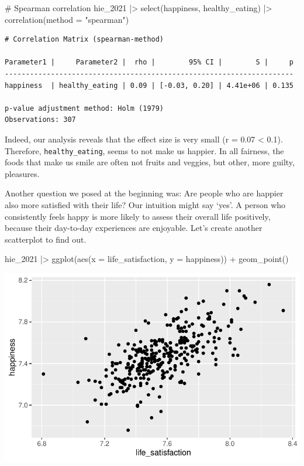 \documentclass[
  letterpaper,
]{krantz}
\makeatletter
\newenvironment{Shaded}{\begin{snugshade}}{\end{snugshade}}
\newcommand{\AttributeTok}[1]{\textcolor[rgb]{0.40,0.45,0.13}{#1}}
\newcommand{\CommentTok}[1]{\textcolor[rgb]{0.37,0.37,0.37}{#1}}
\newcommand{\FunctionTok}[1]{\textcolor[rgb]{0.28,0.35,0.67}{#1}}
\newcommand{\NormalTok}[1]{\textcolor[rgb]{0.00,0.23,0.31}{#1}}
\newcommand{\SpecialCharTok}[1]{\textcolor[rgb]{0.37,0.37,0.37}{#1}}
\newcommand{\StringTok}[1]{\textcolor[rgb]{0.13,0.47,0.30}{#1}}
\newenvironment{kframe}{%
\medskip{}
\setlength{\fboxsep}{.8em}
 \def\at@end@of@kframe{}%
 \ifinner\ifhmode%
  \def\at@end@of@kframe{\end{minipage}}%
  \begin{minipage}{\columnwidth}%
 \fi\fi%
 \def\FrameCommand##1{\hskip\@totalleftmargin \hskip-\fboxsep
 \colorbox{shadecolor}{##1}\hskip-\fboxsep
     \hskip-\linewidth \hskip-\@totalleftmargin \hskip\columnwidth}%
 \MakeFramed {\advance\hsize-\width
   \@totalleftmargin\z@ \linewidth\hsize
   \@setminipage}}%
 {\par\unskip\endMakeFramed%
 \at@end@of@kframe}
\renewenvironment{Shaded}{\begin{kframe}}{\end{kframe}}
\makeatother
\begin{document}
\begin{Shaded}
\begin{Highlighting}[]
\CommentTok{\# Spearman correlation}
\NormalTok{hie\_2021 }\SpecialCharTok{|\textgreater{}}
  \FunctionTok{select}\NormalTok{(happiness, healthy\_eating) }\SpecialCharTok{|\textgreater{}}
  \FunctionTok{correlation}\NormalTok{(}\AttributeTok{method =} \StringTok{"spearman"}\NormalTok{)}
\end{Highlighting}
\end{Shaded}

\begin{verbatim}
# Correlation Matrix (spearman-method)

Parameter1 |     Parameter2 |  rho |        95% CI |        S |     p
---------------------------------------------------------------------
happiness  | healthy_eating | 0.09 | [-0.03, 0.20] | 4.41e+06 | 0.135

p-value adjustment method: Holm (1979)
Observations: 307
\end{verbatim}

Indeed, our analysis reveals that the effect size is very small (r =
0.07 \textless{} 0.1). Therefore, \texttt{healthy\_eating}, seems to not
make us happier. In all fairness, the foods that make us smile are often
not fruits and veggies, but other, more guilty, pleasures.

Another question we posed at the beginning was: Are people who are
happier also more satisfied with their life? Our intuition might say
`yes'. A person who consistently feels happy is more likely to assess
their overall life positively, because their day-to-day experiences are
enjoyable. Let's create another scatterplot to find out.

\begin{Shaded}
\begin{Highlighting}[]
\NormalTok{hie\_2021 }\SpecialCharTok{|\textgreater{}}
  \FunctionTok{ggplot}\NormalTok{(}\FunctionTok{aes}\NormalTok{(}\AttributeTok{x =}\NormalTok{ life\_satisfaction, }\AttributeTok{y =}\NormalTok{ happiness)) }\SpecialCharTok{+}
  \FunctionTok{geom\_point}\NormalTok{()}
\end{Highlighting}
\end{Shaded}

\includegraphics{10_correlations_files/figure-pdf/happiness-vs-life-satisfaction-1.pdf}
\end{document}
